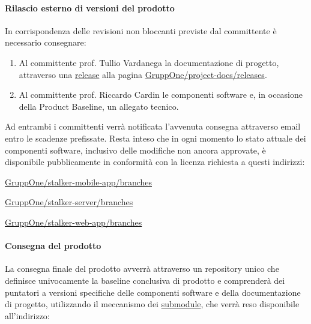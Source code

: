 \documentclass[../../norme-di-progetto.tex]{subfiles}
\begin{document}
\paragraph{Rilascio esterno di versioni del prodotto}%
\label{par:rilascio_esterno_di_versioni_del_prodotto}

In corrispondenza delle revisioni non bloccanti previste dal committente è necessario consegnare:

\begin{enumerate}
  \item Al committente prof. Tullio Vardanega la documentazione di progetto, attraverso una \href{https://help.github.com/en/enterprise/2.16/user/github/administering-a-repository/about-releases}{release} alla pagina \href{https://github.com/GruppOne/project-docs/releases}{GruppOne/project-docs/releases}.
  \item Al committente prof. Riccardo Cardin le componenti software e, in occasione della Product Baseline, un allegato tecnico.
\end{enumerate}

Ad entrambi i committenti verrà notificata l'avvenuta consegna attraverso email entro le scadenze prefissate.
Resta inteso che in ogni momento lo stato attuale dei componenti software, inclusivo delle modifiche non ancora approvate, è disponibile pubblicamente in conformità con la licenza richiesta a questi indirizzi:

\begin{description}
  \item \href{https://github.com/GruppOne/stalker-mobile-app/branches}{GruppOne/stalker-mobile-app/branches}
  \item \href{https://github.com/GruppOne/stalker-server/branches}{GruppOne/stalker-server/branches}
  \item \href{https://github.com/GruppOne/stalker-web-app/branches}{GruppOne/stalker-web-app/branches}
\end{description}


\paragraph{Consegna del prodotto}%
\label{par:consegna_del_prodotto}

La consegna finale del prodotto avverrà attraverso un repository unico che definisce univocamente la baseline conclusiva di prodotto e comprenderà dei puntatori a versioni specifiche delle componenti software e della documentazione di progetto, utilizzando il meccanismo dei \href{https://git-scm.com/book/en/v2/Git-Tools-Submodules}{submodule}, che verrà reso disponibile all'indirizzo:
\end{document}
